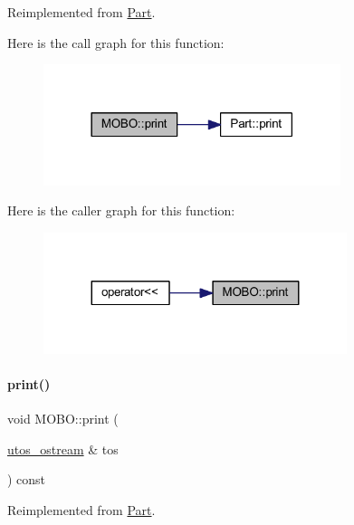 Reimplemented from \mbox{\hyperlink{class_part_a4fa402b8e8fd4236ff773a7697ab2bc3}{Part}}.

Here is the call graph for this function\+:
\nopagebreak
\begin{figure}[H]
\begin{center}
\leavevmode
\includegraphics[width=246pt]{class_m_o_b_o_a3241f425030e01d5b7a192c23af2dbda_cgraph}
\end{center}
\end{figure}
Here is the caller graph for this function\+:
\nopagebreak
\begin{figure}[H]
\begin{center}
\leavevmode
\includegraphics[width=251pt]{class_m_o_b_o_a3241f425030e01d5b7a192c23af2dbda_icgraph}
\end{center}
\end{figure}
\mbox{\label{class_m_o_b_o_a4c78cec3a2a3e4d4480855622f50bd06}} 
\paragraph{\texorpdfstring{print()}{print()}\hspace{0.1cm}{\footnotesize\ttfamily [2/4]}}
{\footnotesize\ttfamily void M\+O\+B\+O\+::print (\begin{DoxyParamCaption}\item[{\mbox{\hyperlink{structutos__ostream}{utos\+\_\+ostream}} \&}]{tos }\end{DoxyParamCaption}) const\hspace{0.3cm}{\ttfamily [virtual]}}



Reimplemented from \mbox{\hyperlink{class_part_a9ecabe44ba3415badf82c6a23617a41e}{Part}}.

